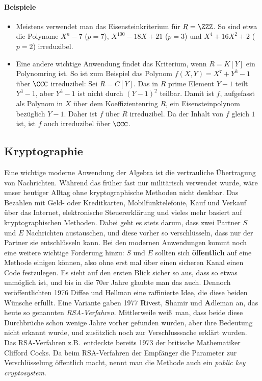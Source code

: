 \documentclass[12pt,a4paper,twoside]{article}
\newcommand{\ei}[1]{\emph{#1}\index{#1}}
\begin{document}
\paragraph{Beispiele}
\begin{itemize}
\item Meistens verwendet man das Eisensteinkriterium f\"ur $R=\ZZZ$. So sind
  etwa die Polynome $X^n-7$ ($p=7$), $X^{100}-18X+21$ ($p=3$) und
  $X^4+16X^2+2$ ($p=2$) irreduzibel.
\item Eine andere wichtige Anwendung findet das Kriterium, wenn $R=K[Y]$ ein
  Polynomring ist. So ist zum Beispiel das Polynom $f(X,Y)=X^7+Y^3-1$ \"uber
  $\CCC$ irreduzibel: Sei $R=C[Y]$. Das in $R$ prime Element $Y-1$ teilt
  $Y^3-1$, aber $Y^3-1$ ist nicht durch $(Y-1)^2$ teilbar. Damit ist $f$,
  aufgefasst als Polynom in $X$ \"uber dem Koeffizientenring $R$, ein
  Eisensteinpolynom bez\"uglich $Y-1$. Daher ist $f$ \"uber $R$ irreduzibel.
  Da der Inhalt von $f$ gleich $1$ ist, ist $f$ auch irreduzibel \"uber
  $\CCC$.
\end{itemize}
\subsection{Kryptographie}
Eine wichtige moderne Anwendung der Algebra ist die vertrauliche \"Ubertragung
von Nachrichten. W\"ahrend das fr\"uher fast nur milit\"arisch verwendet
wurde, w\"are unser heutiger Alltag ohne kryptographische Methoden nicht
denkbar. Das Bezahlen mit Geld- oder Kreditkarten, Mobilfunktelefonie, Kauf
und Verkauf \"uber das Internet, elektronische Steuererkl\"arung und vieles
mehr basiert auf kryptographischen Methoden. Dabei geht es stets darum, dass
zwei Partner $S$ und $E$ Nachrichten austauschen, und diese vorher so
verschl\"usseln, dass nur der Partner sie entschl\"usseln kann. Bei den
modernen Anwendungen kommt noch eine weitere wichtige Forderung hinzu: $S$ und
$E$ sollten sich \textbf{\"offentlich} auf eine Methode einigen k\"onnen, also
ohne erst mal \"uber einen sicheren Kanal einen Code festzulegen. Es sieht auf
den ersten Blick sicher so aus, dass so etwas unm\"oglich ist, und bis in die
70er Jahre glaubte man das auch. Dennoch ver\"offentlichten 1976 Diffee und
Hellman eine raffinierte Idee, die diese beiden W\"unsche erf\"ullt. Eine
Variante gaben 1977 \textbf{R}ivest, \textbf{S}hamir und \textbf{A}dleman an,
das heute so genannten \ei{RSA-Verfahren}. Mittlerweile wei\ss\ man, dass
beide diese Durchbr\"uche schon wenige Jahre vorher gefunden wurden, aber ihre
Bedeutung nicht erkannt wurde, und zus\"atzlich noch zur Verschlusssache
erkl\"art wurden. Das RSA-Verfahren z.B.\ entdeckte bereits 1973 der britische
Mathematiker Clifford Cocks. Da beim RSA-Verfahren der Empf\"anger die
Parameter zur Verschl\"usselung \"offentlich macht, nennt man die Methode auch
ein \ei{public key cryptosystem}.
\end{document}
